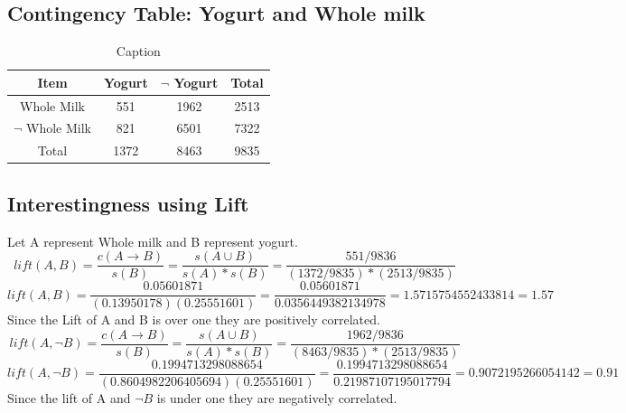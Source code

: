 \documentclass[11pt]{article}
\begin{document}
\subsection{Contingency Table: Yogurt and Whole milk}
\begin{table}[]
    \centering
    \begin{tabular}{|c|c|c|c| } \hline
       Item & Yogurt & $\neg$ Yogurt & Total  \\ \hline
       Whole Milk & 551 & 1962 & 2513 \\ \hline
       $\neg$ Whole Milk & 821  & 6501&  7322\\ \hline 
       Total &1372 & 8463 &9835 \\ \hline
    \end{tabular}
    \caption{Caption}
    \label{tab:my_label}
\end{table}
\subsection{Interestingness using Lift}
Let A represent Whole milk and B represent yogurt. \\
\begin{equation}
lift(A,B) = \frac{c(A \rightarrow B)} {s(B)} = \frac{s(A \cup B)}{s(A)*s(B)} =  \frac{551/9836}{(1372/9835)*(2513/9835)}
\end{equation}
\begin{equation}
lift(A, B) = \frac{0.05601871}{(0.13950178)(0.25551601)} = \frac{0.05601871}{0.0356449382134978} = 1.5715754552433814 = 1.57
\end{equation}
Since the Lift of A and B is over one they are positively correlated. \\
\begin{equation}
lift(A,\neg B) = \frac{c(A \rightarrow B)} {s(B)} = \frac{s(A \cup B)}{s(A)*s(B)} =  \frac{1962/9836}{(8463/9835)*(2513/9835)} 
\end{equation}
\begin{equation}
lift(A, \neg B) =  \frac{0.1994713298088654}{(0.8604982206405694)(0.25551601)} = \frac{0.1994713298088654}{0.21987107195017794} = 0.9072195266054142 = 0.91
\end{equation}
Since the lift of A and $\neg B$ is under one they are negatively correlated.\\
\end{document}
